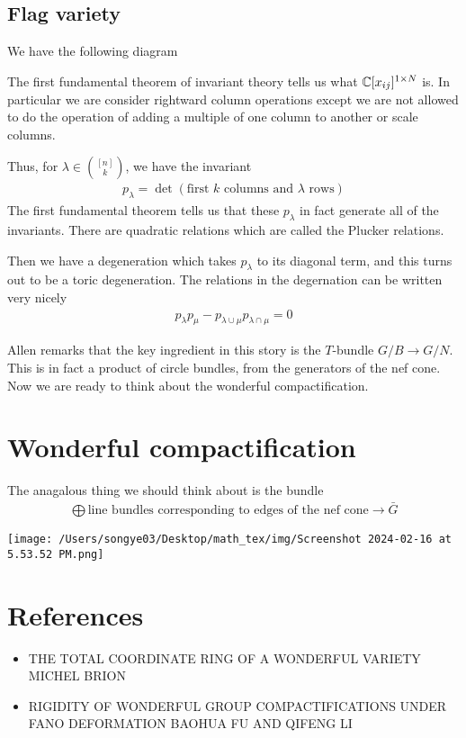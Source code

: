 \documentclass[12pt]{article}
\begin{document}
\subsection{Flag variety}
We have the following diagram \begin{center}
\end{center}
The first fundamental theorem of invariant theory tells us what 
$\mathbb{C}[x_{ij}]^{1\times N}$ is. In particular we are consider rightward column operations except we are not 
allowed to do the operation of adding a multiple of one column to another or scale columns.

Thus, for $\lambda \in \binom{[n]}{k}$, we have the invariant \begin{align*}
    p_\lambda = \det(\text{first $k$ columns and $\lambda$ rows})
\end{align*}
The first fundamental theorem tells us that these $p_\lambda$ in fact generate all of the
invariants. There are quadratic relations which are called the Plucker relations.

Then we have a degeneration which takes $p_\lambda$ to its diagonal term, and this turns out
to be a toric degeneration. The relations in the degernation can be written very nicely \begin{align*}
    p_\lambda p_\mu - p_{\lambda \cup \mu}p_{\lambda \cap \mu} = 0
\end{align*}

Allen remarks that the key ingredient in this story 
is the $T$-bundle $G/B \to G/N$. This is in fact a product of circle bundles, 
from the generators of the nef cone. Now we are ready to think about the
wonderful compactification.
\section{Wonderful compactification}
The anagalous thing we should think about is the bundle \begin{align*}
    \bigoplus \text{line bundles corresponding to edges of the nef cone} \to \bar G
\end{align*}
\begin{center}
    \texttt{[image: /Users/songye03/Desktop/math\_tex/img/Screenshot 2024-02-16 at 5.53.52 PM.png]}
\end{center}

\section{References}
\begin{itemize}
    \item THE TOTAL COORDINATE RING OF A WONDERFUL VARIETY
    MICHEL BRION
    \item RIGIDITY OF WONDERFUL GROUP COMPACTIFICATIONS UNDER
    FANO DEFORMATION
    BAOHUA FU AND QIFENG LI
\end{itemize}
\end{document}
